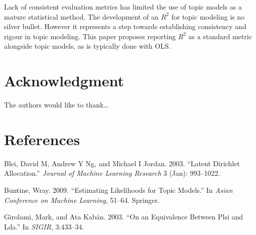 \documentclass[conference,final,]{IEEEtran}
\begin{document}
Lack of consistent evaluation metrics has limited the use of topic
models as a mature statistical method. The development of an \(R^2\) for
topic modeling is no silver bullet. However it represents a step towards
establishing consistency and rigour in topic modeling. This paper
proposes reporting \(R^2\) as a standard metric alongside topic models,
as is typically done with OLS.

\hypertarget{acknowledgment}{%
\section{Acknowledgment}\label{acknowledgment}}

The authors would like to thank\ldots{}

\newpage

\hypertarget{references}{%
\section*{References}\label{references}}

\hypertarget{refs}{}
\leavevmode\hypertarget{ref-blei2003latent}{}%
Blei, David M, Andrew Y Ng, and Michael I Jordan. 2003. ``Latent
Dirichlet Allocation.'' \emph{Journal of Machine Learning Research} 3
(Jan): 993--1022.

\leavevmode\hypertarget{ref-buntine2009estimating}{}%
Buntine, Wray. 2009. ``Estimating Likelihoods for Topic Models.'' In
\emph{Asian Conference on Machine Learning}, 51--64. Springer.

\leavevmode\hypertarget{ref-girolami2003equivalence}{}%
Girolami, Mark, and Ata Kabán. 2003. ``On an Equivalence Between Plsi
and Lda.'' In \emph{SIGIR}, 3:433--34.
\end{document}
